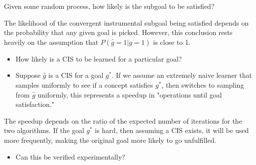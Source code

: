 \documentclass{article}
\begin{document}
Given some random process, how likely is the subgoal to be satisfied?

The likelihood of the convergent instrumental subgoal being satisfied depends on the probability that any given goal is picked. However, this conclusion rests heavily on the assumption that $P(\hat{g}=1|g=1)$ is close to 1.

\begin{itemize}
    \item How likely is a CIS to be learned for a particular goal?
    \item Suppose $\hat{g}$ is a CIS for a goal $g^*$. If we assume an extremely naive learner that samples uniformly to see if a concept satisfies $g^*$, then switches to sampling from $\hat{g}$ uniformly, this represents a speedup in "operations until goal satisfaction."
\end{itemize}

The speedup depends on the ratio of the expected number of iterations for the two algorithms. If the goal $g^*$ is hard, then assuming a CIS exists, it will be used more frequently, making the original goal more likely to go unfulfilled.

\begin{itemize}
    \item Can this be verified experimentally?
\end{itemize}
\end{document}
